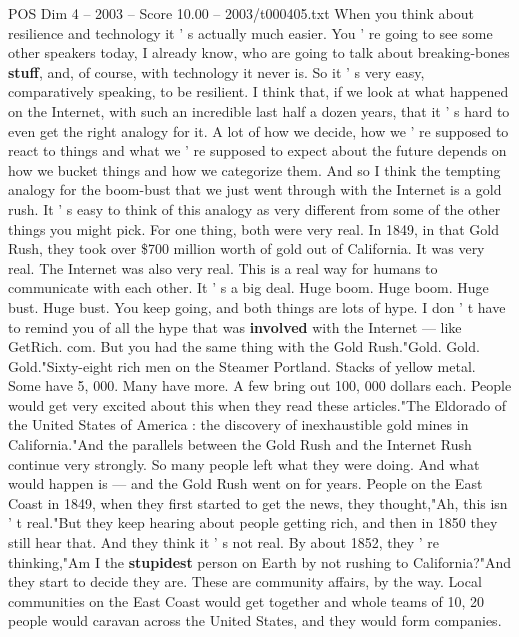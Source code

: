 \begin{textsample}{POS Dim 4 – 2003 – Score 10.00 – 2003/t000405.txt}  \label{ex:f4_pos_038}
When you think about resilience and technology it ' s actually much easier.
You ' re going to see some other speakers today, I already know, who are going to talk about breaking-bones \textbf{stuff}, and, of course, with technology it never is.
So it ' s very easy, comparatively speaking, to be resilient.
I think that, if we look at what happened on the Internet, with such an incredible last half a dozen years, that it ' s hard to even get the right analogy for it.
A lot of how we decide, how we ' re supposed to react to things and what we ' re supposed to expect about the future depends on how we bucket things and how we categorize them.
And so I think the tempting analogy for the boom-bust that we just went through with the Internet is a gold rush.
It ' s easy to think of this analogy as very different from some of the other things you might pick.
For one thing, both were very real.
In 1849, in that Gold Rush, they took over \$700 million worth of gold out of California.
It was very real.
The Internet was also very real.
This is a real way for humans to communicate with each other.
It ' s a big deal.
Huge boom.
Huge boom.
Huge bust.
Huge bust.
You keep going, and both things are lots of hype.
I don ' t have to remind you of all the hype that was \textbf{involved} with the Internet — like GetRich. com.
But you had the same thing with the Gold Rush."Gold.
Gold.
Gold."Sixty-eight rich men on the Steamer Portland.
Stacks of yellow metal.
Some have 5, 000.
Many have more.
A few bring out 100, 000 dollars each.
People would get very excited about this when they read these articles."The Eldorado of the United States of America : the discovery of inexhaustible gold mines in California."And the parallels between the Gold Rush and the Internet Rush continue very strongly.
So many people left what they were doing.
And what would happen is — and the Gold Rush went on for years.
People on the East Coast in 1849, when they first started to get the news, they thought,"Ah, this isn ' t real."But they keep hearing about people getting rich, and then in 1850 they still hear that.
And they think it ' s not real.
By about 1852, they ' re thinking,"Am I the \textbf{stupidest} person on Earth by not rushing to California?"And they start to decide they are.
These are community affairs, by the way.
Local communities on the East Coast would get together and whole teams of 10, 20 people would caravan across the United States, and they would form companies.

\end{textsample}

